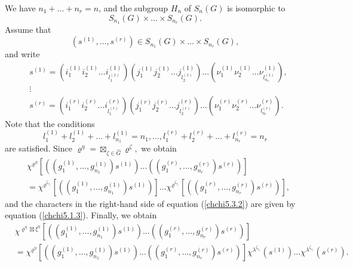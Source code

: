 \documentclass[12pt]{amsart}
\theoremstyle{definition}
\numberwithin{equation}{section}
\begin{document}
We have $n_1+\ldots+n_r=n$, and the subgroup $H_n$ of $S_n(G)$ is isomorphic to
$$
S_{n_1}(G)\times\ldots\times S_{n_r}(G).
$$
Assume that
$$
\left(s^{(1)},\ldots, s^{(r)}\right)\in S_{n_1}(G)\times\ldots\times S_{n_r}(G),
$$
and write
\begin{equation}
\begin{split}
&s^{(1)}=\left(i^{(1)}_1i^{(1)}_2\ldots i^{(1)}_{l_1^{(1)}}\right)
\left(j^{(1)}_1j^{(1)}_2\ldots j^{(1)}_{l_2^{(1)}}\right)
\ldots
\left(\nu^{(1)}_1\nu^{(1)}_2\ldots \nu^{(1)}_{l_{n_1}^{(1)}}\right),\\
&\vdots\\
&s^{(r)}=\left(i^{(r)}_1i^{(r)}_2\ldots i^{(r)}_{l_1^{(r)}}\right)
\left(j^{(r)}_1j^{(r)}_2\ldots j^{(r)}_{l_2^{(r)}}\right)
\ldots
\left(\nu^{(r)}_1\nu^{(r)}_2\ldots \nu^{(r)}_{l_{n_r}^{(r)}}\right).
\end{split}
\end{equation}
Note that the conditions
\begin{equation}
l_1^{(1)}+l_2^{(1)}+\ldots+l_{n_1}^{(1)}=n_1,\ldots,
l_1^{(r)}+l_2^{(r)}+\ldots+l_{n_r}^{(r)}=n_r
\end{equation}
are satisfied. Since
$
\varrho^{\eta}=\boxtimes_{\zeta\in\widehat{G}}\varrho^{\zeta},
$
we obtain
\begin{equation}\label{chchi5.3.2}
\begin{split}
&\chi^{\varrho^{\eta}}\left[\left(\left(g_1^{(1)},\ldots,g_{n_1}^{(1)}\right)s^{(1)}\right)\ldots
\left(\left(g_1^{(r)},\ldots,g_{n_r}^{(r)}\right)s^{(r)}\right)\right]\\
&=\chi^{\varrho^{\zeta_{\tau_1}}}\left[\left(\left(g_1^{(1)},\ldots,g_{n_1}^{(1)}\right)s^{(1)}\right)\right]
\ldots
\chi^{\varrho^{\zeta_{\tau_r}}}\left[\left(\left(g_1^{(r)},\ldots,g_{n_r}^{(r)}\right)s^{(r)}\right)\right],
\end{split}
\end{equation}
and the characters in the right-hand side of equation (\ref{chchi5.3.2}) are given by equation (\ref{chchi5.1.3}). Finally, we obtain
\begin{equation}\label{chchi5.3.1}
\begin{split}
&\chi^{\varrho^{\eta}\boxtimes\xi^{\eta}}\left[\left(\left(g_1^{(1)},\ldots,g_{n_1}^{(1)}\right)s^{(1)}\right)\ldots
\left(\left(g_1^{(r)},\ldots,g_{n_r}^{(r)}\right)s^{(r)}\right)\right]\\
&=\chi^{\varrho^{\eta}}\left[\left(\left(g_1^{(1)},\ldots,g_{n_1}^{(1)}\right)s^{(1)}\right)\ldots
\left(\left(g_1^{(r)},\ldots,g_{n_r}^{(r)}\right)s^{(r)}\right)\right]
\chi^{\lambda^{\zeta_{\tau_1}}}(s^{(1)})\ldots\chi^{\lambda^{\zeta_{\tau_r}}}(s^{(r)}).
\end{split}
\end{equation}
\end{document}
